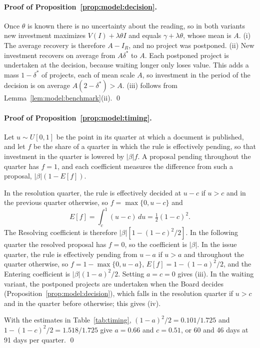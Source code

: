 \paragraph{Proof of Proposition~\ref{prop:model:decision}.}
Once $\theta$ is known there is no uncertainty about the reading, so in both variants new investment maximizes $V(I)+\lambda\theta I$ and equals $\gamma+\lambda\theta$, whose mean is $A$. (i) The average recovery is therefore $A-I_R$, and no project was postponed. (ii) New investment recovers on average from $A\delta^{*}$ to $A$. Each postponed project is undertaken at the decision, because waiting longer only loses value. This adds a mass $1-\delta^{*}$ of projects, each of mean scale $A$, so investment in the period of the decision is on average $A(2-\delta^{*})>A$. (iii) follows from Lemma~\ref{lem:model:benchmark}(ii). \qed

\paragraph{Proof of Proposition~\ref{prop:model:timing}.}
Let $u\sim U[0,1]$ be the point in its quarter at which a document is published, and let $f$ be the share of a quarter in which the rule is effectively pending, so that investment in the quarter is lowered by $|\beta|f$. A proposal pending throughout the quarter has $f=1$, and each coefficient measures the difference from such a proposal, $|\beta|(1-E[f])$.

In the resolution quarter, the rule is effectively decided at $u-c$ if $u>c$ and in the previous quarter otherwise, so $f=\max\{0,u-c\}$ and
\[
  E[f]=\int_{c}^{1}(u-c)\,du=\tfrac12(1-c)^{2}.
\]
The Resolving coefficient is therefore $|\beta|[1-(1-c)^{2}/2]$. In the following quarter the resolved proposal has $f=0$, so the coefficient is $|\beta|$. In the issue quarter, the rule is effectively pending from $u-a$ if $u>a$ and throughout the quarter otherwise, so $f=1-\max\{0,u-a\}$, $E[f]=1-(1-a)^{2}/2$, and the Entering coefficient is $|\beta|(1-a)^{2}/2$. Setting $a=c=0$ gives (iii). In the waiting variant, the postponed projects are undertaken when the Board decides (Proposition~\ref{prop:model:decision}), which falls in the resolution quarter if $u>c$ and in the quarter before otherwise; this gives (iv).

With the estimates in Table~\ref{tab:timing}, $(1-a)^{2}/2=0.101/1.725$ and $1-(1-c)^{2}/2=1.518/1.725$ give $a=0.66$ and $c=0.51$, or 60 and 46 days at 91 days per quarter. %
\qed

